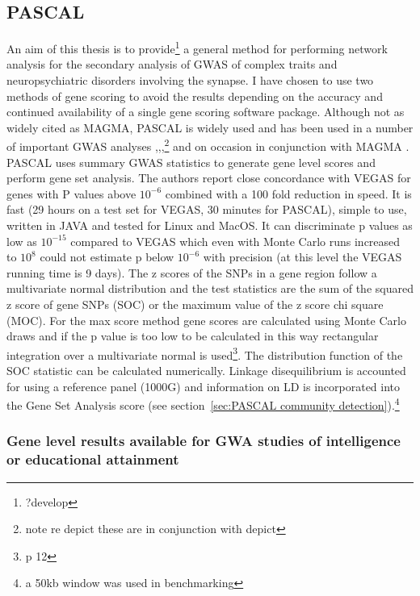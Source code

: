 \subsection{PASCAL}
\label{sec:PASCAL_gene_score}
An aim of this thesis is to provide\footnote{?develop} a general method for performing network analysis for the secondary analysis of GWAS of complex traits and neuropsychiatric disorders involving the synapse. I have chosen to use two methods of gene scoring to avoid the results depending on the accuracy and continued availability of a single gene scoring software package. Although not as widely cited as MAGMA, PASCAL\cite{lamparter2016fast} is widely used and has been used in a number of important GWAS analyses \cite{liu2019association},\cite{marouli2017rare},\cite{jones2019genome},\footnote{note re depict these are in conjunction with depict} and on occasion in conjunction with MAGMA \cite{dashti2019genome}.
PASCAL uses summary GWAS statistics to generate gene level scores and perform gene set analysis. The authors report close concordance with VEGAS for genes with P values above $10^{-6}$ combined with a 100 fold reduction in speed. It is fast (29 hours on a test set for VEGAS, 30 minutes for PASCAL), simple to use, written in JAVA and tested for Linux and MacOS. It can discriminate p values as low as $10^{-15}$ compared to VEGAS which even with Monte Carlo runs increased to $10^8$ could not estimate p below $10^{-6}$ with precision (at this level the VEGAS running time is 9 days). The z scores of the SNPs in a gene region follow a multivariate normal distribution and the test statistics are the sum of the squared z score of gene SNPs (SOC) or the maximum value of the z score chi square (MOC). For the max score method gene scores are calculated using Monte Carlo draws and if the p value is too low to be calculated in this way rectangular integration over a multivariate normal is used\cite{genz1992numerical}\cite{lamparter2016fast}\footnote{p 12}. The distribution function of the SOC statistic can be calculated numerically\cite{davies1980distribution}. Linkage disequilibrium is accounted for using a reference panel (1000G) and information on LD is incorporated into the Gene Set Analysis score (see section~\ref{sec:PASCAL community detection}).\footnote{a 50kb window was used in benchmarking}


\subsubsection{Gene level results available for GWA studies of intelligence or educational attainment}
\label{sec:tmp bit about gene level tests in studies of intelligence}

